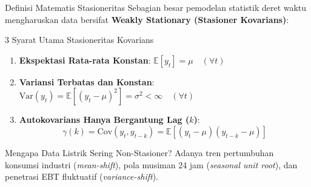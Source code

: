 \documentclass[aspectratio=169, 10pt]{beamer}
\begin{document}
\begin{frame}{Definisi Matematis Stasioneritas}
    Sebagian besar pemodelan statistik deret waktu mengharuskan data bersifat \textbf{Weakly Stationary (Stasioner Kovarians)}:
    \begin{block}{3 Syarat Utama Stasioneritas Kovarians}
        \begin{enumerate}
            \item \textbf{Ekspektasi Rata-rata Konstan}: $\mathbb{E}[y_t] = \mu \quad (\forall t)$
            \item \textbf{Variansi Terbatas dan Konstan}: $\mathrm{Var}(y_t) = \mathbb{E}[(y_t - \mu)^2] = \sigma^2 < \infty \quad (\forall t)$
            \item \textbf{Autokovarians Hanya Bergantung Lag ($k$)}:
            \[
                \gamma(k) = \mathrm{Cov}(y_t, y_{t-k}) = \mathbb{E}[(y_t - \mu)(y_{t-k} - \mu)]
            \]
        \end{enumerate}
    \end{block}
    \begin{alertblock}{Mengapa Data Listrik Sering Non-Stasioner?}
        Adanya tren pertumbuhan konsumsi industri (\textit{mean-shift}), pola musiman 24 jam (\textit{seasonal unit root}), dan penetrasi EBT fluktuatif (\textit{variance-shift}).
    \end{alertblock}
\end{frame}
\end{document}
